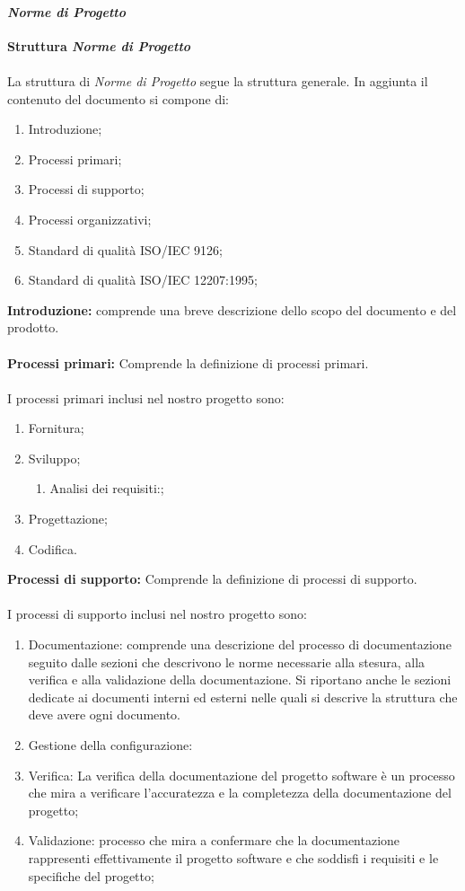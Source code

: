 \paragraph{\textit{Norme di Progetto}}
\textbf{Struttura \textit{Norme di Progetto}}
\\\\
La struttura di \textit{Norme di Progetto} segue la struttura generale.
In aggiunta il contenuto del documento si compone di:
\begin{enumerate}
    \item Introduzione;
    \item Processi primari;
    \item Processi di supporto;
    \item Processi organizzativi;
    \item Standard di qualità ISO/IEC 9126;
    \item Standard di qualità ISO/IEC 12207:1995;
\end{enumerate}
\textbf{Introduzione:} comprende una breve descrizione dello scopo del documento e del prodotto.
\\\\
\textbf{Processi primari:}
Comprende la definizione di processi primari. 
\\\\
I processi primari inclusi nel nostro progetto sono:
\begin{enumerate}
    \item Fornitura;
    \item Sviluppo;
        \begin{enumerate}
            \item Analisi dei requisiti:;
        \end{enumerate}
    \item Progettazione;
    \item Codifica.
\end{enumerate}
\textbf{Processi di supporto:} 
Comprende la definizione di processi di supporto.
\\\\
I processi di supporto inclusi nel nostro progetto sono:
\begin{enumerate}
    \item Documentazione: comprende una descrizione del processo di documentazione seguito dalle sezioni che descrivono le norme necessarie alla stesura, alla verifica e 
    alla validazione della documentazione. Si riportano anche le sezioni dedicate ai documenti interni ed esterni nelle quali si descrive la struttura che deve avere ogni documento.
    \item Gestione della configurazione: 
    \item Verifica: La verifica della documentazione del progetto software è un processo che mira a verificare l'accuratezza e la completezza della documentazione del progetto;
    \item Validazione: processo che mira a confermare che la documentazione rappresenti effettivamente il progetto software e che soddisfi i requisiti e le specifiche del progetto;
\end{enumerate}
